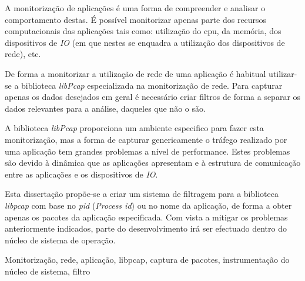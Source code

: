 \resumo 

A monitorização de aplicações é uma forma de compreender e analisar o comportamento destas. 
É possível monitorizar apenas parte dos recursos computacionais das aplicações tais como: utilização do cpu, da memória, dos dispositivos de \textit{IO} (em que nestes se enquadra a utilização dos dispositivos de rede), etc. 

De forma a monitorizar a utilização de rede de uma aplicação é habitual utilizar-se a biblioteca \textit{libPcap} especializada na monitorização de rede. Para capturar apenas os dados desejados em geral é necessário criar filtros de forma a separar os dados relevantes para a análise, daqueles que não o são. 

A biblioteca \textit{libPcap} proporciona um ambiente especifico para fazer esta monitorização, mas a forma de capturar genericamente o tráfego realizado por uma aplicação tem grandes problemas a nível de performance. Estes problemas são devido à dinâmica que as aplicações apresentam e à estrutura de comunicação entre as aplicações e os dispositivos de \textit{IO}.

Esta dissertação propõe-se a criar um sistema de filtragem para a biblioteca \textit{libpcap} com base no \textit{pid} (\textit{Process id}) ou no nome da aplicação, de forma a obter apenas os pacotes da aplicação especificada. Com vista a mitigar os problemas anteriormente indicados, parte do desenvolvimento irá ser efectuado dentro do núcleo de sistema de operação.




% 
% 
% 

\begin{keywords}
Monitorização, rede, aplicação, libpcap, captura de pacotes, instrumentação do núcleo de sistema, filtro
\end{keywords}
